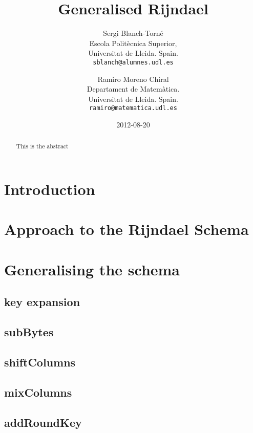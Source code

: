 \documentclass[12pt,a4paper,twoside]{article}
\title{Generalised Rijndael}
\author{
  Sergi Blanch-Torn\'e\\
    \small Escola Polit\`ecnica Superior,\\
    \small Universitat de Lleida. Spain.\\
    \small \texttt{sblanch@alumnes.udl.es}\\
  \and
  Ramiro Moreno Chiral\\
    \small Departament de Matem\`atica.\\
    \small Universitat de Lleida. Spain.\\
    \small \texttt{ramiro@matematica.udl.es}\\
}
\date{2012-08-20}
\begin{document}
\maketitle

 \begin{abstract}
  This is the abstract
 \end{abstract}

 \section{Introduction}
 \section{Approach to the Rijndael Schema}
 \section{Generalising the schema}
 \subsection{key expansion}
 \subsection{subBytes}
 \subsection{shiftColumns}
 \subsection{mixColumns}
 \subsection{addRoundKey}
\end{document}
